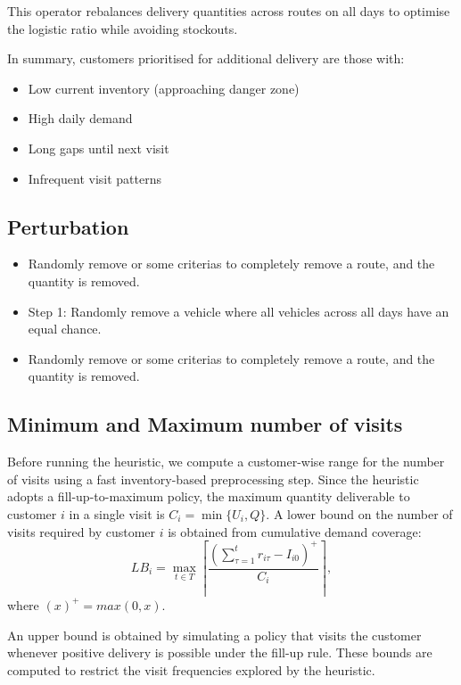 \documentclass{article}
\begin{document}
This operator rebalances delivery quantities across routes on all days to optimise the logistic ratio while avoiding stockouts.



In summary, customers prioritised for additional delivery are those with:
\begin{itemize}
    \item Low current inventory (approaching danger zone)
    \item High daily demand
    \item Long gaps until next visit
    \item Infrequent visit patterns
\end{itemize}

\subsection{Perturbation}

\begin{itemize}
    \item  Randomly remove or some criterias to completely remove a route, and the quantity is removed.
\end{itemize}


\begin{itemize}
    \item  Step 1: Randomly remove a vehicle where all vehicles across all days have an equal chance. 
    \item Randomly remove or some criterias to completely remove a route, and the quantity is removed.
\end{itemize}

\subsection{Minimum and Maximum number of visits}
Before running the heuristic, we compute a customer-wise range for the number of visits using a fast inventory-based preprocessing step. Since the heuristic adopts a fill-up-to-maximum policy, the maximum quantity deliverable to customer \(i\) in a single visit is \(C_i=\min\{U_i,Q\}\). A lower bound on the number of visits required by customer \(i\) is obtained from cumulative demand coverage:
\[
LB_i=\max_{t\in T}\left\lceil\frac{\left(\sum_{\tau=1}^{t} r_{i\tau}-I_{i0}\right)^+}{C_i}\right\rceil,
\]
where $(x)^+=max(0,x)$.  

An upper bound is obtained by simulating a policy that visits the customer whenever positive delivery is possible under the fill-up rule. These bounds are computed to restrict the visit frequencies explored by the heuristic.
\end{document}

